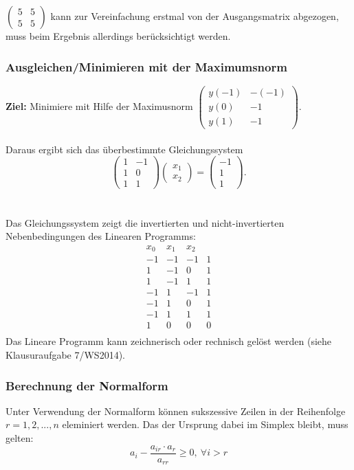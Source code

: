 \(\begin{pmatrix} 5 & 5 \\ 5 & 5 \end{pmatrix}\) kann zur Vereinfachung erstmal von der Ausgangsmatrix abgezogen, muss beim Ergebnis allerdings berücksichtigt werden.

\subsubsection{Ausgleichen/Minimieren mit der Maximumsnorm}
\textbf{Ziel:} Minimiere mit Hilfe der Maximusnorm \(\begin{pmatrix} y(-1) & -(-1) \\ y(0) & -1 \\ y(1) & -1 \end{pmatrix}\).
\\\\
Daraus ergibt sich das überbestimmte Gleichungssystem
\[\begin{pmatrix} 1 & -1 \\ 1 & 0 \\ 1 & 1 \end{pmatrix} \begin{pmatrix} x_1 \\ x_2 \end{pmatrix} = \begin{pmatrix} -1 \\ 1 \\ 1\end{pmatrix}.\]
\\\\
Das Gleichungssystem zeigt die invertierten und nicht-invertierten Nebenbedingungen des Linearen Programms:
\[\begin{array}{ccc|c}
	x_0 & x_1 & x_2 \\
	\hline
	-1 & -1 & -1 & 1 \\
	 1 & -1 &  0 & 1 \\
	 1 & -1 &  1 & 1 \\
	-1 &  1 & -1 & 1 \\
	-1 &  1 &  0 & 1 \\
	-1 &  1 &  1 & 1 \\
	\hline
	1 & 0 & 0 & 0 \\
\end{array}\]
Das Lineare Programm kann zeichnerisch oder rechnisch gelöst werden (siehe Klausuraufgabe 7/WS2014).

\subsubsection{Berechnung der Normalform}
Unter Verwendung der Normalform können sukszessive Zeilen in der Reihenfolge \(r=1,2,...,n\) eleminiert werden. Das der Ursprung dabei im Simplex bleibt, muss gelten:
\[a_i - \frac{a_{ir}\cdot a_r}{a_{rr}} \geq 0,~ \forall i>r\]

